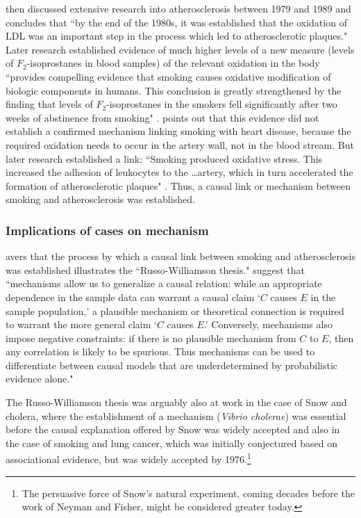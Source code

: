 \documentclass[11pt,reqno]{amsart}
\begin{document}
\begin{doublespace}
 \citet{Gillies2011-GILTRT-3} then discussed extensive research into atherosclerosis between 1979 and 1989 and concludes that ``by the end of the 1980s, it was established that the oxidation of LDL was an important step in the process which led to atherosclerotic plaques."  Later research established evidence of much higher levels of a new measure (levels of $F_2$-isoprostanes in blood samples) of the relevant oxidation in the body ``provides compelling evidence that smoking causes oxidative modification of biologic components in humans. This conclusion is greatly strengthened by the finding that levels of $F_2$-isoprostanes in the smokers fell significantly after two weeks of abstinence from smoking" \citep[pp.\,1201--2]{Morrow:1995gz}.  \citet[p.\,120]{Gillies2011-GILTRT-3} points out that this evidence did not establish a confirmed mechanism linking smoking with heart disease, because the required oxidation needs to occur in the artery wall, not in the blood stream. But later research established a link: ``Smoking produced oxidative stress. This increased the adhesion of leukocytes to the \dots artery, which in turn accelerated the formation of atherosclerotic plaques" \citep[p.\,123]{Gillies2011-GILTRT-3}.
Thus, a causal link or mechanism between smoking and atherosclerosis was established.


\subsubsection{Implications of cases on mechanism}
 \citet{Gillies2011-GILTRT-3} avers that the process by which a causal link between smoking and atherosclerosis was established illustrates the ``Russo-Williamson thesis."
 \citet[p.\,159]{Russo:2007iz} suggest that ``mechanisms allow us to generalize a causal relation: while an appropriate dependence in the sample data can warrant a causal claim `$C$ causes $E$ in the sample population,' a plausible mechanism or theoretical connection is required to warrant the more general claim `$C$ causes $E$.' Conversely, mechanisms also impose negative constraints: if there is no plausible mechanism from $C$ to $E$, then any correlation is likely to be spurious. Thus mechanisms can be used to differentiate between causal models that are underdetermined by probabilistic evidence alone."

The Russo-Williamson thesis was arguably also at work in the case of Snow and cholera, where the establishment of a mechanism (\emph{Vibrio cholerae}) was essential before the causal explanation offered by Snow was widely accepted and also in the case of smoking and lung cancer, which was initially conjectured based on associational evidence, but was widely accepted by 1976.\footnote{
The persuasive force of Snow's natural experiment, coming decades before the work of Neyman and Fisher, might be considered greater today.}


\end{doublespace}
\end{document}
